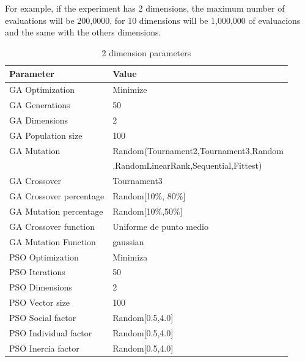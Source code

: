 \documentclass[runningheads]{llncs}
\begin{document}
For example, if the experiment has 2 dimensions, the maximum number of evaluations will be 200,0000, for 10 dimensions will be 1,000,000 of evaluacions and the same with the others dimensions.









   \begin{table}[htp]
    \caption{2 dimension parameters}
    \label{table:ga-pso-parameters-2}
    \centering
    \begin{tabular}{|l|l|}
    \hline
    Parameter & Value \\
    \hline
    \hline
    GA Optimization & Minimize \\
    \hline
    GA Generations & 50 \\
    \hline
    GA Dimensions & 2 \\
    \hline
    GA Population size & 100 \\
    \hline
    GA Mutation & Random(Tournament2,Tournament3,Random \\
    &  ,RandomLinearRank,Sequential,Fittest)\\
    \hline
    GA Crossover & Tournament3 \\
    \hline
    GA Crossover percentage & Random[10\%, 80\%] \\
    \hline
    GA Mutation percentage & Random[10\%,50\%] \\
    \hline
    GA Crossover function & Uniforme de punto medio \\
    \hline
    GA Mutation Function & gaussian \\
    \hline
    PSO Optimization & Minimiza \\
    \hline
    PSO Iterations & 50 \\
    \hline
    PSO Dimensions & 2 \\
    \hline
    PSO Vector size & 100 \\
    \hline
    PSO Social factor & Random[0.5,4.0] \\
    \hline
    PSO Individual factor & Random[0.5,4.0] \\
    \hline
    PSO Inercia factor & Random[0.5,4.0] \\
    \hline
    \end{tabular}
    \end{table}
\end{document}
